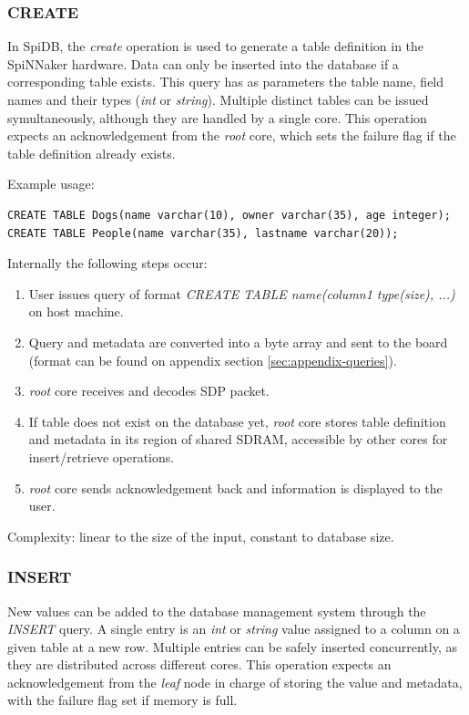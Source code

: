 \subsubsection{CREATE}
In SpiDB, the \textit{create} operation is used to generate a table definition in the SpiNNaker hardware. Data can only be inserted into the database if a corresponding table exists. This query has as parameters the table name, field names and their types (\textit{int} or \textit{string}). Multiple distinct tables can be issued symultaneously, although they are handled by a single core. 
This operation expects an acknowledgement from the \textit{root} core, which sets the failure flag if the table definition already exists.

Example usage:
\begin{lstlisting}
CREATE TABLE Dogs(name varchar(10), owner varchar(35), age integer);
CREATE TABLE People(name varchar(35), lastname varchar(20));
\end{lstlisting}

Internally the following steps occur:
\begin{enumerate}
\item User issues query of format \textit{CREATE TABLE name(column1 type(size), ...)} on host machine.
\item Query and metadata are converted into a byte array and sent to the board (format can be found on appendix section \ref{sec:appendix-queries}).
\item \textit{root} core receives and decodes SDP packet.
\item If table does not exist on the database yet, \textit{root} core stores table definition and metadata in its region of shared SDRAM, accessible by other cores for insert/retrieve operations. 
\item \textit{root} core sends acknowledgement back and information is displayed to the user.
\end{enumerate}

Complexity: linear to the size of the input, constant to database size.
   
\subsubsection{INSERT}
New values can be added to the database management system through the \textit{INSERT} query. A single entry is an \textit{int} or \textit{string} value assigned to a column on a given table at a new row. Multiple entries can be safely inserted concurrently, as they are distributed across different cores. This operation expects an acknowledgement from the \textit{leaf} node in charge of storing the value and metadata, with the failure flag set if memory is full.


